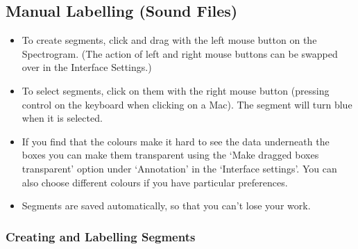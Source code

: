 \documentclass{article}
\begin{document}
\subsection{Manual Labelling (Sound Files)}

\begin{itemize}
\item To create segments, click and drag with the left mouse button on the Spectrogram. (The action of left and right mouse buttons can be swapped over in the Interface Settings.)
\item To select segments, click on them with the right mouse button (pressing control on the keyboard when clicking on a Mac). The segment will turn blue when it is selected.
\item If you find that the colours make it hard to see the data underneath the boxes you can make them transparent using the `Make dragged boxes transparent' option under `Annotation' in the `Interface settings'. You can also choose different colours if you have particular preferences.
\item Segments are saved automatically, so that you can't lose your work.
\end{itemize}

\subsubsection*{Creating and Labelling Segments}
\end{document}
